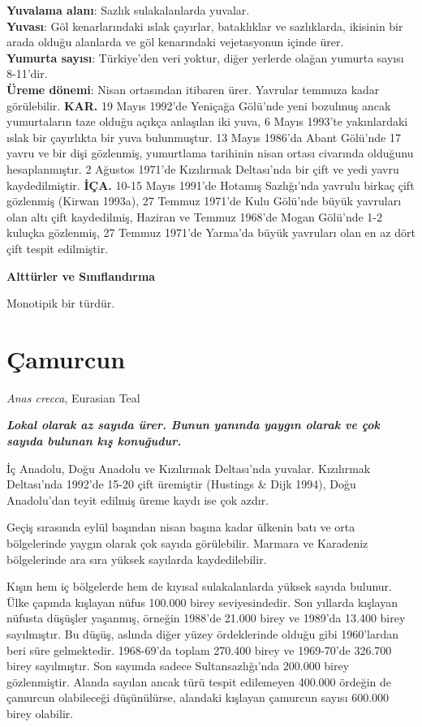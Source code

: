\documentclass[
  letterpaper,
  DIV=11,
  numbers=noendperiod]{scrreprt}
\begin{document}
\textbf{Yuvalama alanı}: Sazlık sulakalanlarda yuvalar.\\
\textbf{Yuvası}: Göl kenarlarındaki ıslak çayırlar, bataklıklar ve
sazlıklarda, ikisinin bir arada olduğu alanlarda ve göl kenarındaki
vejetasyonun içinde ürer.\\
\textbf{Yumurta sayısı}: Türkiye'den veri yoktur, diğer yerlerde olağan
yumurta sayısı 8-11'dir.\\
\textbf{Üreme dönemi}: Nisan ortasından itibaren ürer. Yavrular temmuza
kadar görülebilir. \textbf{KAR.} 19 Mayıs 1992'de Yeniçağa Gölü'nde yeni
bozulmuş ancak yumurtaların taze olduğu açıkça anlaşılan iki yuva, 6
Mayıs 1993'te yakınlardaki ıslak bir çayırlıkta bir yuva bulunmuştur. 13
Mayıs 1986'da Abant Gölü'nde 17 yavru ve bir dişi gözlenmiş, yumurtlama
tarihinin nisan ortası civarında olduğunu hesaplanmıştır. 2 Ağustos
1971'de Kızılırmak Deltası'nda bir çift ve yedi yavru kaydedilmiştir.
\textbf{İÇA.} 10-15 Mayıs 1991'de Hotamış Sazlığı'nda yavrulu birkaç
çift gözlenmiş (Kirwan 1993a), 27 Temmuz 1971'de Kulu Gölü'nde büyük
yavruları olan altı çift kaydedilmiş, Haziran ve Temmuz 1968'de Mogan
Gölü'nde 1-2 kuluçka gözlenmiş, 27 Temmuz 1971'de Yarma'da büyük
yavruları olan en az dört çift tespit edilmiştir.

\textbf{Alttürler ve Sınıflandırma}

Monotipik bir türdür.

\section{Çamurcun}\label{uxe7amurcun}

\emph{Anas crecca}, Eurasian Teal

\textbf{\emph{Lokal olarak az sayıda ürer. Bunun yanında yaygın olarak
ve çok sayıda bulunan kış konuğudur.}}

İç Anadolu, Doğu Anadolu ve Kızılırmak Deltası'nda yuvalar. Kızılırmak
Deltası'nda 1992'de 15-20 çift üremiştir (Hustings \& Dijk 1994), Doğu
Anadolu'dan teyit edilmiş üreme kaydı ise çok azdır.

Geçiş sırasında eylül başından nisan başına kadar ülkenin batı ve orta
bölgelerinde yaygın olarak çok sayıda görülebilir. Marmara ve Karadeniz
bölgelerinde ara sıra yüksek sayılarda kaydedilebilir.

Kışın hem iç bölgelerde hem de kıyısal sulakalanlarda yüksek sayıda
bulunur. Ülke çapında kışlayan nüfus 100.000 birey seviyesindedir. Son
yıllarda kışlayan nüfusta düşüşler yaşanmış, örneğin 1988'de 21.000
birey ve 1989'da 13.400 birey sayılmıştır. Bu düşüş, aslında diğer yüzey
ördeklerinde olduğu gibi 1960'lardan beri süre gelmektedir. 1968-69'da
toplam 270.400 birey ve 1969-70'de 326.700 birey sayılmıştır. Son
sayımda sadece Sultansazlığı'nda 200.000 birey gözlenmiştir. Alanda
sayılan ancak türü tespit edilemeyen 400.000 ördeğin de çamurcun
olabileceği düşünülürse, alandaki kışlayan çamurcun sayısı 600.000 birey
olabilir.
\end{document}
